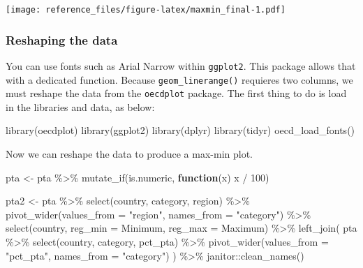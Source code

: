 \documentclass[
]{article}
\newenvironment{Shaded}{\begin{snugshade}}{\end{snugshade}}
\newcommand{\AttributeTok}[1]{\textcolor[rgb]{0.77,0.63,0.00}{#1}}
\newcommand{\ControlFlowTok}[1]{\textcolor[rgb]{0.13,0.29,0.53}{\textbf{#1}}}
\newcommand{\DecValTok}[1]{\textcolor[rgb]{0.00,0.00,0.81}{#1}}
\newcommand{\FunctionTok}[1]{\textcolor[rgb]{0.00,0.00,0.00}{#1}}
\newcommand{\NormalTok}[1]{#1}
\newcommand{\OtherTok}[1]{\textcolor[rgb]{0.56,0.35,0.01}{#1}}
\newcommand{\SpecialCharTok}[1]{\textcolor[rgb]{0.00,0.00,0.00}{#1}}
\newcommand{\StringTok}[1]{\textcolor[rgb]{0.31,0.60,0.02}{#1}}
\begin{document}
\texttt{[image: reference\_files/figure-latex/maxmin\_final-1.pdf]}

\hypertarget{reshaping-the-data}{%
\subsubsection{Reshaping the data}\label{reshaping-the-data}}

You can use fonts such as Arial Narrow within \texttt{ggplot2}. This
package allows that with a dedicated function. Because
\texttt{geom\_linerange()} requieres two columns, we must reshape the
data from the \texttt{oecdplot} package. The first thing to do is load
in the libraries and data, as below:

\begin{Shaded}
\begin{Highlighting}[]
\FunctionTok{library}\NormalTok{(oecdplot)}
\FunctionTok{library}\NormalTok{(ggplot2)}
\FunctionTok{library}\NormalTok{(dplyr)}
\FunctionTok{library}\NormalTok{(tidyr)}
\FunctionTok{oecd\_load\_fonts}\NormalTok{()}
\end{Highlighting}
\end{Shaded}

Now we can reshape the data to produce a max-min plot.

\begin{Shaded}
\begin{Highlighting}[]
\NormalTok{pta }\OtherTok{\textless{}{-}}\NormalTok{ pta }\SpecialCharTok{\%\textgreater{}\%} 
  \FunctionTok{mutate\_if}\NormalTok{(is.numeric, }\ControlFlowTok{function}\NormalTok{(x) x }\SpecialCharTok{/} \DecValTok{100}\NormalTok{)}

\NormalTok{pta2 }\OtherTok{\textless{}{-}}\NormalTok{ pta }\SpecialCharTok{\%\textgreater{}\%} 
  \FunctionTok{select}\NormalTok{(country, category, region) }\SpecialCharTok{\%\textgreater{}\%} 
  \FunctionTok{pivot\_wider}\NormalTok{(}\AttributeTok{values\_from =} \StringTok{"region"}\NormalTok{, }\AttributeTok{names\_from =} \StringTok{"category"}\NormalTok{) }\SpecialCharTok{\%\textgreater{}\%} 
  \FunctionTok{select}\NormalTok{(country, }\AttributeTok{reg\_min =}\NormalTok{ Minimum, }\AttributeTok{reg\_max =}\NormalTok{ Maximum) }\SpecialCharTok{\%\textgreater{}\%} 
  \FunctionTok{left\_join}\NormalTok{(}
\NormalTok{    pta }\SpecialCharTok{\%\textgreater{}\%} 
      \FunctionTok{select}\NormalTok{(country, category, pct\_pta) }\SpecialCharTok{\%\textgreater{}\%} 
      \FunctionTok{pivot\_wider}\NormalTok{(}\AttributeTok{values\_from =} \StringTok{"pct\_pta"}\NormalTok{, }\AttributeTok{names\_from =} \StringTok{"category"}\NormalTok{) }
\NormalTok{  ) }\SpecialCharTok{\%\textgreater{}\%} 
\NormalTok{  janitor}\SpecialCharTok{::}\FunctionTok{clean\_names}\NormalTok{()}
\end{Highlighting}
\end{Shaded}
\end{document}
